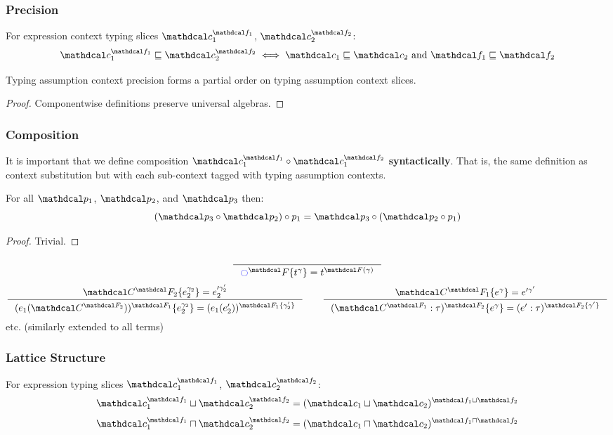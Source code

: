 \subsubsection{Precision}
\begin{definition}
For expression context typing slices $\Cs_1^{\f_1}$, $\Cs_2^{\f_2}$:
\[\Cs_1^{\f_1} \sqsubseteq \Cs_2^{\f_2} \iff  \Cs_1 \sqsubseteq \Cs_2 \text{ and } \f_1 \sqsubseteq \f_2\]
\end{definition}\begin{proposition}
Typing assumption context precision forms a partial order on typing assumption context slices.
\end{proposition}
\begin{proof}
Componentwise definitions preserve universal algebras.
\end{proof}
\subsubsection{Composition}
\begin{definition}
It is important that we define composition $\Cs_1^{\f_1} \circ \Cs_1^{\f_2}$ \textbf{syntactically}. That is, the same definition as context substitution but with each sub-context tagged with typing assumption contexts.
\end{definition}\begin{proposition}
For all $\p_1$, $\p_2$, and $\p_3$ then:
\[(\p_3 \circ \p_2) \circ p_1 = \p_3 \circ (\p_2 \circ p_1)\]
\end{proposition}
\begin{proof}
Trivial.
\end{proof}
\begin{definition}
\label{def:ContextSliceSubstitution}
\[\inference{}{\cmark^\F\{t^\gamma\} = t^{\F(\gamma)}}\]
\[\inference{\C^\F_2\{e_2^{\gamma_2}\} = e_2'^{\gamma_2'}}{(e_1(\C^{\F_2}))^{\F_1}\{e_2^{\gamma_2}\} = (e_1(e_2'))^{\F_1\{\gamma_2'\}}} \qquad \inference{\C^\F_1\{e^\gamma\} = e'^{\gamma'}}{(\C^{\F_1} : \tau)^{\F_2}\{e^\gamma\} = (e' : \tau)^{\F_2\{\gamma'\}}}\]
etc. (similarly extended to all terms)
\end{definition}
\subsubsection{Lattice Structure}
\begin{definition}
For expression typing slices $\Cs_1^{\f_1}$, $\Cs_2^{\f_2}$:
\[\Cs_1^{\f_1} \sqcup \Cs_2^{\f_2} = (\Cs_1 \sqcup \Cs_2)^{\f_1 \sqcup \f_2}\]
\[\Cs_1^{\f_1} \sqcap \Cs_2^{\f_2} = (\Cs_1 \sqcap \Cs_2)^{\f_1 \sqcap \f_2}\]
\end{definition}

